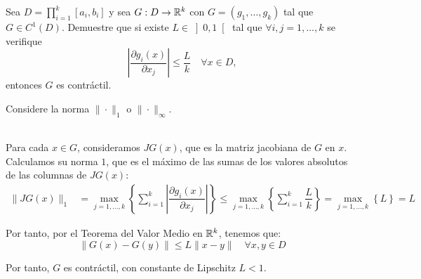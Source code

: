 \begin{ejercicio}\label{ej:1.1.16}
    Sea $D = \prod\limits_{i=1}^k[a_i, b_i]$ y sea $G : D \to \mathbb{R}^k$ con $G = (g_1, \ldots, g_k)$ tal que $G \in C^1(D)$. Demuestre que si existe $L \in\left]0, 1\right[$ tal que $\forall i, j = 1, \ldots, k$ se verifique
    \begin{equation*}
        \left\lvert \dfrac{\partial g_i(x)}{\partial x_j} \right\rvert \leq \dfrac{L}{k}\quad \forall x \in D,
    \end{equation*}
    entonces $G$ es contráctil.
    \begin{observacion}
        Considere la norma $\| \cdot \|_1$ o $\| \cdot \|_\infty$.
    \end{observacion}~\\

    Para cada $x\in G$, consideramos $JG(x)$, que es la matriz jacobiana de $G$ en $x$. Calculamos su norma $1$, que es el máximo de las sumas de los valores absolutos de las columnas de $JG(x)$:
    \begin{align*}
        \|JG(x)\|_1 &= \max_{j=1,\ldots,k}\left\{\sum_{i=1}^k\left|\dfrac{\partial g_i(x)}{\partial x_j}\right|\right\}\leq \max_{j=1,\ldots,k}\left\{\sum_{i=1}^k\dfrac{L}{k}\right\}=\max_{j=1,\ldots,k}\left\{L\right\}=L
    \end{align*}

    Por tanto, por el Teorema del Valor Medio en $\mathbb{R}^k$, tenemos que:
    \begin{equation*}
        \|G(x)-G(y)\| \leq L\|x-y\|\quad \forall x,y\in D
    \end{equation*}

    Por tanto, $G$ es contráctil, con constante de Lipschitz $L<1$.
\end{ejercicio}


